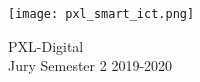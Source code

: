 \begin{figure}[!b]
  \centering
  \texttt{[image: pxl\_smart\_ict.png]}
  \caption{PXL-Digital\\
  Jury Semester 2 2019-2020}
\end{figure}